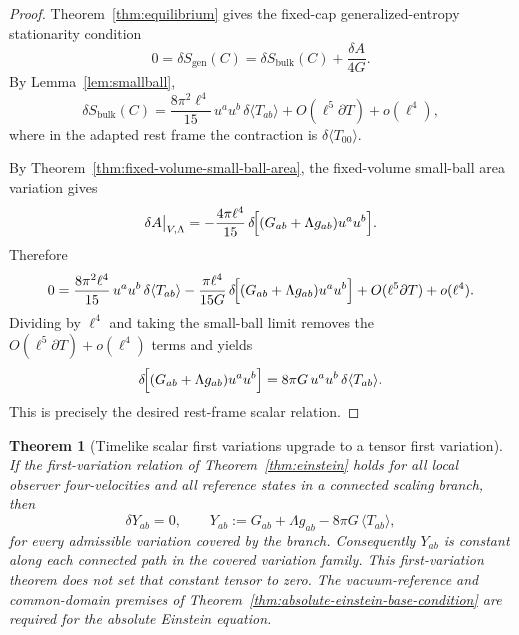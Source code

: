 \documentclass[11pt]{article}
\newtheorem{theorem}{Theorem}[section]
\begin{document}
\begin{proof}
Theorem~\ref{thm:equilibrium} gives the fixed-cap generalized-entropy stationarity condition
\[
0=\delta S_{\mathrm{gen}}(C)
=
\delta S_{\mathrm{bulk}}(C)+\frac{\delta A}{4G}.
\]
By Lemma~\ref{lem:smallball},
\[
\delta S_{\mathrm{bulk}}(C)
=
\frac{8\pi^2\ell^4}{15}\,u^a u^b\,\delta\langle T_{ab}\rangle
+O(\ell^5\partial T)+o(\ell^4),
\]
where in the adapted rest frame the contraction is $\delta\langle T_{00}\rangle$.

By Theorem~\ref{thm:fixed-volume-small-ball-area}, the fixed-volume small-ball area variation gives
\[
\delta A\big|_{V,\Lambda}
=
-\frac{4\pi\ell^4}{15}\,
\delta\!\Bigl[(G_{ab}+\Lambda g_{ab})u^a u^b\Bigr].
\]
Therefore
\[
0
=
\frac{8\pi^2\ell^4}{15}\,u^a u^b\,\delta\langle T_{ab}\rangle
-\frac{\pi\ell^4}{15G}\,
\delta\!\Bigl[(G_{ab}+\Lambda g_{ab})u^a u^b\Bigr]
+O(\ell^5\partial T)+o(\ell^4).
\]
Dividing by $\ell^4$ and taking the small-ball limit removes the $O(\ell^5\partial T)+o(\ell^4)$ terms and yields
\[
\delta\!\Bigl[(G_{ab}+\Lambda g_{ab})u^a u^b\Bigr]
=
8\pi G\,u^a u^b\,\delta\langle T_{ab}\rangle.
\]
This is precisely the desired rest-frame scalar relation.
\end{proof}

\begin{theorem}[Timelike scalar first variations upgrade to a tensor first variation]\label{cor:einstein}
If the first-variation relation of Theorem~\ref{thm:einstein} holds for all local observer four-velocities and all reference states in a connected scaling branch, then
\[
\delta Y_{ab}=0,
\qquad
Y_{ab}:=G_{ab}+\Lambda g_{ab}-8\pi G\,\langle T_{ab}\rangle,
\]
for every admissible variation covered by the branch. Consequently \(Y_{ab}\)
is constant along each connected path in the covered variation family. This
first-variation theorem does not set that constant tensor to zero. The
vacuum-reference and common-domain premises of
Theorem~\ref{thm:absolute-einstein-base-condition} are required for the
absolute Einstein equation.
\end{theorem}
\end{document}
